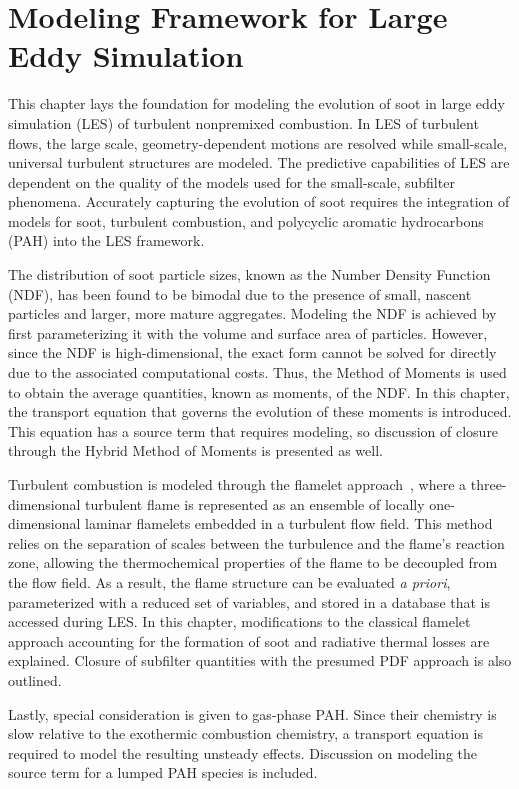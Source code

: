 \chapter{Modeling Framework for Large Eddy Simulation\label{ch:lesmodels}}

This chapter lays the foundation for modeling the evolution of soot in large eddy simulation (LES) of turbulent nonpremixed combustion. In LES of turbulent flows, the large scale, geometry-dependent motions are resolved while small-scale, universal turbulent structures are modeled. The predictive capabilities of LES are dependent on the quality of the models used for the small-scale, subfilter phenomena. Accurately capturing the evolution of soot requires the integration of models for soot, turbulent combustion, and polycyclic aromatic hydrocarbons (PAH) into the LES framework.

The distribution of soot particle sizes, known as the Number Density Function (NDF), has been found to be bimodal due to the presence of small, nascent particles and larger, more mature aggregates. Modeling the NDF is achieved by first parameterizing it with the volume and surface area of particles. However, since the NDF is high-dimensional, the exact form cannot be solved for directly due to the associated computational costs. Thus, the Method of Moments is used to obtain the average quantities, known as moments, of the NDF. In this chapter, the transport equation that governs the evolution of these moments is introduced. This equation has a source term that requires modeling, so discussion of closure through the Hybrid Method of Moments is presented as well.

Turbulent combustion is modeled through the flamelet approach~\cite{peters1984}, where a three-dimensional turbulent flame is represented as an ensemble of locally one-dimensional laminar flamelets embedded in a turbulent flow field. This method relies on the separation of scales between the turbulence and the flame's reaction zone, allowing the thermochemical properties of the flame to be decoupled from the flow field. As a result, the flame structure can be evaluated \textit{a priori}, parameterized with a reduced set of variables, and stored in a database that is accessed during LES. In this chapter, modifications to the classical flamelet approach accounting for the formation of soot and radiative thermal losses are explained. Closure of subfilter quantities with the presumed PDF approach is also outlined.

Lastly, special consideration is given to gas-phase PAH. Since their chemistry is slow relative to the exothermic combustion chemistry, a transport equation is required to model the resulting unsteady effects. Discussion on modeling the source term for a lumped PAH species is included.

